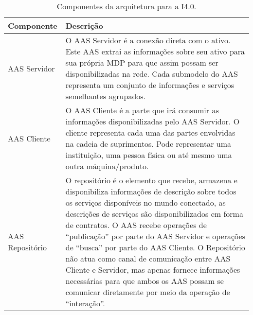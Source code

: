 \begin{table}[htb]
	\centering
	\caption{Componentes da arquitetura para a I4.0.}
	\begin{tabular}{p{3cm}p{12cm}}
		\hline
		\textbf{Componente}
		 & \textbf{Descrição}                                                                                                                                                                                                                                                                                                                                                                                                                                                                                                                                                  \\

		\hline
		AAS Servidor
		 & O AAS Servidor é a conexão direta com o ativo. Este AAS extrai as informações sobre seu ativo para sua própria MDP para que assim possam ser disponibilizadas na rede. Cada submodelo do AAS representa um conjunto de informações e serviços semelhantes agrupados.                                                                                                                                                                                                                                                                                                \\

		\hline
		AAS Cliente
		 & O AAS Cliente é a parte que irá consumir as informações disponibilizadas pelo AAS Servidor. O cliente representa cada uma das partes envolvidas na cadeia de suprimentos. Pode representar uma instituição, uma pessoa física ou até mesmo uma outra máquina/produto.                                                                                                                                                                                                                                                                                               \\

		\hline
		AAS Repositório
		 & O repositório é o elemento que recebe, armazena e disponibiliza informações de descrição sobre todos os serviços disponíveis no mundo conectado, as descrições de serviços são disponibilizados em forma de contratos. O AAS recebe operações de ``publicação'' por parte do AAS Servidor e operações de ``busca'' por parte do AAS Cliente. O Repositório não atua como canal de comunicação entre AAS Cliente e Servidor, mas apenas fornece informações necessárias para que ambos os AAS possam se comunicar diretamente por meio da operação de ``interação''. \\

		\hline
	\end{tabular}
	\label{tab:componentes-ws}
\end{table}

